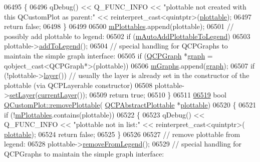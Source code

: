 \begin{DoxyCode}
06495   \{
06496     qDebug() << Q\_FUNC\_INFO << \textcolor{stringliteral}{"plottable not created with this QCustomPlot as parent:"} << \textcolor{keyword}{
      reinterpret\_cast<}quintptr\textcolor{keyword}{>}(\hyperlink{a00116_a5c198d46ea2a2255a1b73e2c590f0364}{plottable});
06497     \textcolor{keywordflow}{return} \textcolor{keyword}{false};
06498   \}
06499   
06500   \hyperlink{a00116_a57ed6eb2e0a767a8344de45110a3e81d}{mPlottables}.append(plottable);
06501   \textcolor{comment}{// possibly add plottable to legend:}
06502   \textcolor{keywordflow}{if} (\hyperlink{a00116_ada47453c490f699c82bb400d749b2cf4}{mAutoAddPlottableToLegend})
06503     plottable->\hyperlink{a00024_a70f8cabfd808f7d5204b9f18c45c13f5}{addToLegend}();
06504   \textcolor{comment}{// special handling for QCPGraphs to maintain the simple graph interface:}
06505   \textcolor{keywordflow}{if} (\hyperlink{a00031}{QCPGraph} *\hyperlink{a00116_ac6b19830ab0f0073ff3089cf7c9b3c2e}{graph} = qobject\_cast<QCPGraph*>(plottable))
06506     \hyperlink{a00116_a54ed2081d9366a6c2137bf9d9f7b8371}{mGraphs}.append(\hyperlink{a00116_ac6b19830ab0f0073ff3089cf7c9b3c2e}{graph});
06507   \textcolor{keywordflow}{if} (!plottable->\hyperlink{a00044_aea67e8c19145e70d68c286a36f6b8300}{layer}()) \textcolor{comment}{// usually the layer is already set in the constructor of the plottable
       (via QCPLayerable constructor)}
06508     plottable->\hyperlink{a00044_ab0d0da6d2de45a118886d2c8e16d5a54}{setLayer}(\hyperlink{a00116_af73057345656cbd1463454982d808b00}{currentLayer}());
06509   \textcolor{keywordflow}{return} \textcolor{keyword}{true};
06510 \}
06511 
\hypertarget{a00115_source_l06519}{}\hyperlink{a00116_af3dafd56884208474f311d6226513ab2}{06519} \textcolor{keywordtype}{bool} \hyperlink{a00116_af3dafd56884208474f311d6226513ab2}{QCustomPlot::removePlottable}(
      \hyperlink{a00024}{QCPAbstractPlottable} *\hyperlink{a00116_a5c198d46ea2a2255a1b73e2c590f0364}{plottable})
06520 \{
06521   \textcolor{keywordflow}{if} (!\hyperlink{a00116_a57ed6eb2e0a767a8344de45110a3e81d}{mPlottables}.contains(plottable))
06522   \{
06523     qDebug() << Q\_FUNC\_INFO << \textcolor{stringliteral}{"plottable not in list:"} << \textcolor{keyword}{reinterpret\_cast<}quintptr\textcolor{keyword}{>}(
      \hyperlink{a00116_a5c198d46ea2a2255a1b73e2c590f0364}{plottable});
06524     \textcolor{keywordflow}{return} \textcolor{keyword}{false};
06525   \}
06526   
06527   \textcolor{comment}{// remove plottable from legend:}
06528   plottable->\hyperlink{a00024_aa1f350e510326d012b9a9c9249736c83}{removeFromLegend}();
06529   \textcolor{comment}{// special handling for QCPGraphs to maintain the simple graph interface:}

\end{DoxyCode}
